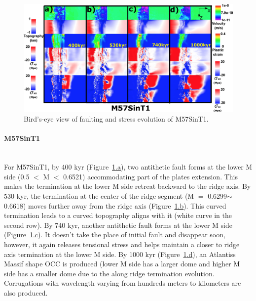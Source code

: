 \begin{figure}[h]
 \centering
  \includegraphics[width=1.0\textwidth]{./Figures/fig_Results_Weakening_3_M57SinT1_time_evolution.eps}
 \caption{Bird's-eye view of faulting and stress evolution of M57SinT1.}
\label{fig_Results_Weakenging_3}
\end{figure}

\paragraph{M57SinT1}\label{para_M57SinT1}
~\\
For M57SinT1, by 400 kyr (Figure~\hyperref[fig_Results_Weakenging_3]{\ref{fig_Results_Weakenging_3}.a}), two antithetic fault forms at the lower M side (0.5 $<$ M $<$ 0.6521) accommodating part of the plates extension. This makes the termination at the lower M side retreat backward to the ridge axis. By 530 kyr, the termination at the center of the ridge segment (M $=$ 0.6299$\sim$0.6618) moves further away from the ridge axis (Figure~\hyperref[fig_Results_Weakenging_3]{\ref{fig_Results_Weakenging_3}.b}). This curved termination leads to a curved topography aligns with it (white curve in the second row). By 740 kyr, another antithetic fault forms at the lower M side (Figure~\hyperref[fig_Results_Weakenging_3]{\ref{fig_Results_Weakenging_3}.c}). It doesn't take the place of initial fault and disappear soon, however, it again releases tensional stress and helps maintain a closer to ridge axis termination at the lower M side. By 1000 kyr (Figure~\hyperref[fig_Results_Weakenging_3]{\ref{fig_Results_Weakenging_3}.d}), an Atlantiss Massif shape OCC is produced (lower M side has a larger dome and higher M side has a smaller dome due to the along ridge termination evolution. Corrugations with wavelength varying from hundreds meters to kilometers are also produced.       

